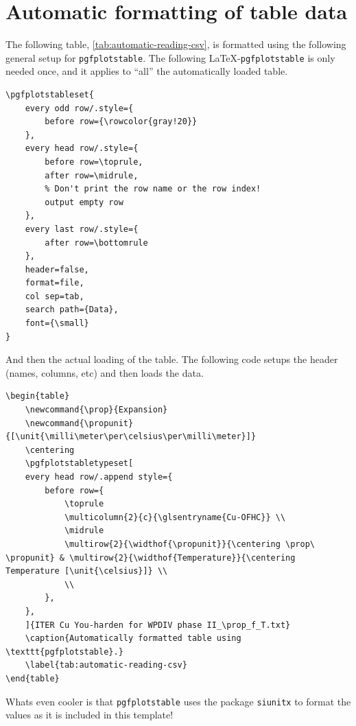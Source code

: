 \section{Automatic formatting of table data} \label{sec:pgfplotstable}

The following table, \cref{tab:automatic-reading-csv}, is formatted using the following general setup for \verb|pgfplotstable|. The following \LaTeX-\verb|pgfplotstable| is only needed once, and it applies to ``all'' the automatically loaded table.

\begin{lstlisting}[language={[LaTeX]TeX}]
% Configure the general setting of pgfplotstable
\pgfplotstableset{
	every odd row/.style={
		before row={\rowcolor{gray!20}}
	},
	every head row/.style={
		before row=\toprule,
		after row=\midrule,
		% Don't print the row name or the row index!
		output empty row
	},
	every last row/.style={
		after row=\bottomrule
	},
	header=false,
	format=file,
	col sep=tab,
	search path={Data},
	font={\small}
}
\end{lstlisting}

And then the actual loading of the table. The following code setups the header (names, columns, etc) and then loads the data.
\begin{lstlisting}[language={[LaTeX]TeX}]
\begin{table}
	\newcommand{\prop}{Expansion}
	\newcommand{\propunit}{[\unit{\milli\meter\per\celsius\per\milli\meter}]}
	\centering
	\pgfplotstabletypeset[
	every head row/.append style={
		before row={
			\toprule
			\multicolumn{2}{c}{\glsentryname{Cu-OFHC}} \\
			\midrule
			\multirow{2}{\widthof{\propunit}}{\centering \prop\ \propunit} & \multirow{2}{\widthof{Temperature}}{\centering Temperature [\unit{\celsius}]} \\
			\\
		},
	},
	]{ITER Cu You-harden for WPDIV phase II_\prop_f_T.txt}
	\caption{Automatically formatted table using \texttt{pgfplotstable}.}
	\label{tab:automatic-reading-csv}
\end{table}
\end{lstlisting}

Whats even cooler is that \verb|pgfplotstable| uses the package \verb|siunitx| to format the values as it is included in this template!


